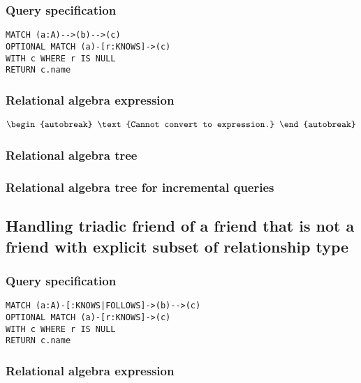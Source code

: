 \subsubsection*{Query specification}

\begin{lstlisting}
MATCH (a:A)-->(b)-->(c)
OPTIONAL MATCH (a)-[r:KNOWS]->(c)
WITH c WHERE r IS NULL
RETURN c.name
\end{lstlisting}

\subsubsection*{Relational algebra expression}

\begin{align*}
\begin{autobreak}
\text{Cannot convert to expression.}
\end{autobreak}
\end{align*}

\subsubsection*{Relational algebra tree}


\subsubsection*{Relational algebra tree for incremental queries}


\subsection{Handling triadic friend of a friend that is not a friend with explicit subset of relationship type}

\subsubsection*{Query specification}

\begin{lstlisting}
MATCH (a:A)-[:KNOWS|FOLLOWS]->(b)-->(c)
OPTIONAL MATCH (a)-[r:KNOWS]->(c)
WITH c WHERE r IS NULL
RETURN c.name
\end{lstlisting}

\subsubsection*{Relational algebra expression}

